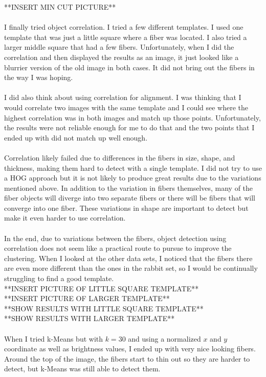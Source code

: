 \documentclass[11pt,psfig]{article}
\begin{document}
**INSERT MIN CUT PICTURE**\\
\\
I finally tried object correlation. I tried a few different templates. I used one template that was just a little square where a fiber was located. I also tried a larger middle square that had a few fibers. Unfortunately, when I did the correlation and then displayed the results as an image, it just looked like a blurrier version of the old image in both cases. It did not bring out the fibers in the way I was hoping. \\
\\
I did also think about using correlation for alignment. I was thinking that I would correlate two images with the same template and I could see where the highest correlation was in both images and match up those points. Unfortunately, the results were not reliable enough for me to do that and the two points that I ended up with did not match up well enough. \\
\\
Correlation likely failed due to differences in the fibers in size, shape, and thickness, making them hard to detect with a single template. I did not try to use a HOG approach but it is not likely to produce great results due to the variations mentioned above. In addition to the variation in fibers themselves, many of the fiber objects will diverge into two separate fibers or there will be fibers that will converge into one fiber. These variations in shape are important to detect but make it even harder to use correlation. \\
\\
In the end, due to variations between the fibers, object detection using correlation does not seem like a practical route to pursue to improve the clustering. When I looked at the other data sets, I noticed that the fibers there are even more different than the ones in the rabbit set, so I would be continually struggling to find a good template. 
\\
**INSERT PICTURE OF LITTLE SQUARE TEMPLATE**\\
**INSERT PICTURE OF LARGER TEMPLATE**\\
**SHOW RESULTS WITH LITTLE SQUARE TEMPLATE**\\
**SHOW RESULTS WITH LARGER TEMPLATE**\\
\\
When I tried k-Means but with $k=30$ and using a normalized $x$ and $y$ coordinate as well as brightness values, I ended up with very nice looking fibers. Around the top of the image, the fibers start to thin out so they are harder to detect, but k-Means was still able to detect them. 
\end{document}
